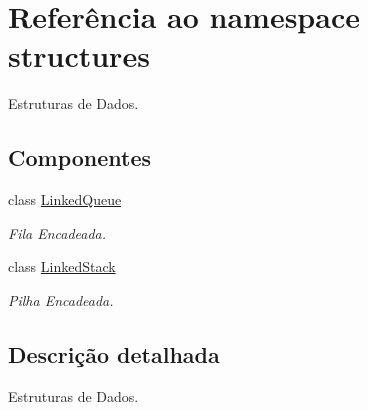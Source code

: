 \hypertarget{namespacestructures}{}\section{Referência ao namespace structures}
\label{namespacestructures}


Estruturas de Dados.  


\subsection*{Componentes}
\begin{DoxyCompactItemize}
\item 
class \mbox{\hyperlink{classstructures_1_1_linked_queue}{Linked\+Queue}}
\begin{DoxyCompactList}\small\item\em Fila Encadeada. \end{DoxyCompactList}\item 
class \mbox{\hyperlink{classstructures_1_1_linked_stack}{Linked\+Stack}}
\begin{DoxyCompactList}\small\item\em Pilha Encadeada. \end{DoxyCompactList}\end{DoxyCompactItemize}


\subsection{Descrição detalhada}
Estruturas de Dados. 